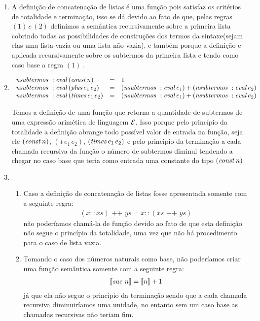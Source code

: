 \begin{enumerate}
	  \item  A defini\c{c}\~ao de concatena\c{c}\~ao de listas \'e uma fun\c{c}\~ao pois satisfaz os crit\'erios de totalidade e termina\c{c}\~ao, isso se dá devido ao fato de que, pelas regras $(1) \, e \, (2)$ definimos a sem\^antica recursivamente sobre a primeira lista cobrindo todas as possibilidades de constru\c{c}\~oes dos termos da sintaxe(sejam elas uma lista vazia ou uma lista n\~ao vazia), e tamb\'em porque a defini\c{c}\~ao e aplicada recursivamente sobre os subtermos da primeira lista e tendo como caso base a regra $(1)$\,.

	  \item
	  \[
	  \begin{array}{lcl}
	  \textit{nsubtermos }:\textit{eval\/}\, (\textit{const\/}\, n)  & = & 1 \\
	  \textit{nsubtermos }:\textit{eval\/}\, (\textit{plus\/}\,e_1\,e_2) & = & (\textit{nsubtermos }: \textit{eval\/}\,e_1) + (\textit{nsubtermos }: \textit{eval\/}\,e_2) \\
	  \textit{nsubtermos }:\textit{eval\/}\, (\textit{times\/}\,e_1\,e_2) & = & (\textit{nsubtermos }: \textit{eval\/}\,e_1) + (\textit{nsubtermos }: \textit{eval\/}\,e_2) \\
	  \end{array}
	  \]

	  Temos a definição de uma função que retorna a quantidade de subtermos de uma expressão arimética de linguagem $\mathcal{E}$. Isso porque pelo princípio da totalidade a definição abrange todo possível valor de entrada na função, seja ele $(\textit{const\/}\, n)$, $(\tplus\,e_1\,e_2)$, $(\textit{times\/}\,e_1\,e_2)$ e pelo principio da terminação a cada chamada recursiva da função o número de subtermos diminui tendendo a chegar no caso base que teria como entrada uma constante do tipo $(\textit{const\/}\, n)$


	  \item
	  \begin{enumerate}
	  \item Caso a definição de concatenação de listas fosse apresentada somente com a seguinte regra:
	  	  \[
	  	  \begin{array}{c}
	  	  	(x :: xs) \text{ ++ }  ys  =  x :: (xs\text{ ++ } ys)
	  	  \end{array}
	  	  \]
	  não poderíamos chamá-la de função devido ao fato de que esta definição não segue o princípio da totalidade, uma vez que não há procedimento para o caso de lista vazia.

	 \item Tomando o caso dos números naturais como base, não poderíamos criar uma função semântica somente com a seguinte regra:
	 	 \[
	 	 \begin{array}{c}
	 	 	\llbracket \textit{suc\/}\,\,n\rrbracket  =  \llbracket n \rrbracket + 1
	 	\end{array}
	 	\]
	 já que ela não segue o principio da terminação sendo que a cada chamada recursiva diminuiríamos uma unidade, no entanto sem um caso base as chamadas recursivas não teriam fim.
	 \end{enumerate}

	\end{enumerate}

